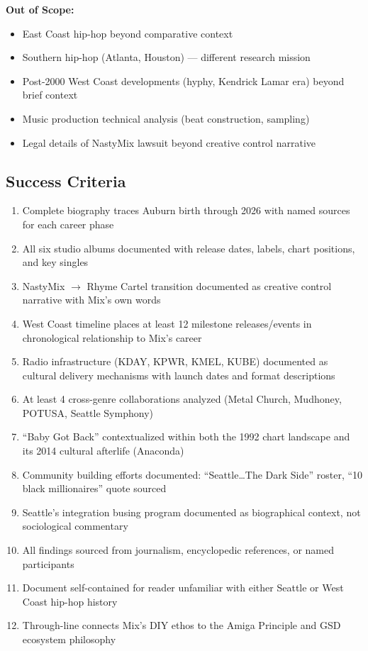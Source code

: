 \documentclass[11pt,letterpaper]{article}
\begin{document}
\textbf{Out of Scope:}
\begin{itemize}[leftmargin=2em]
\item East Coast hip-hop beyond comparative context
\item Southern hip-hop (Atlanta, Houston) --- different research mission
\item Post-2000 West Coast developments (hyphy, Kendrick Lamar era) beyond brief context
\item Music production technical analysis (beat construction, sampling)
\item Legal details of NastyMix lawsuit beyond creative control narrative
\end{itemize}

\subsection{Success Criteria}

\begin{enumerate}[leftmargin=2em]
\item Complete biography traces Auburn birth through 2026 with named sources for each career phase
\item All six studio albums documented with release dates, labels, chart positions, and key singles
\item NastyMix $\rightarrow$ Rhyme Cartel transition documented as creative control narrative with Mix's own words
\item West Coast timeline places at least 12 milestone releases/events in chronological relationship to Mix's career
\item Radio infrastructure (KDAY, KPWR, KMEL, KUBE) documented as cultural delivery mechanisms with launch dates and format descriptions
\item At least 4 cross-genre collaborations analyzed (Metal Church, Mudhoney, POTUSA, Seattle Symphony)
\item ``Baby Got Back'' contextualized within both the 1992 chart landscape and its 2014 cultural afterlife (Anaconda)
\item Community building efforts documented: ``Seattle\ldots The Dark Side'' roster, ``10 black millionaires'' quote sourced
\item Seattle's integration busing program documented as biographical context, not sociological commentary
\item All findings sourced from journalism, encyclopedic references, or named participants
\item Document self-contained for reader unfamiliar with either Seattle or West Coast hip-hop history
\item Through-line connects Mix's DIY ethos to the Amiga Principle and GSD ecosystem philosophy
\end{enumerate}
\end{document}
